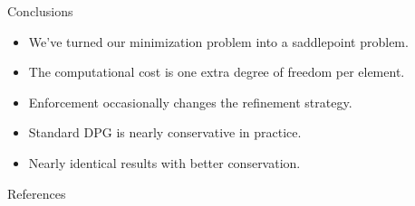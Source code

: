 \documentclass[final]{beamer}
\newlength{\onecolwid}
\begin{document}
\begin{frame}[t]
\begin{columns}[t]
\begin{column}{\onecolwid}
\begin{block}{Conclusions}
\begin{itemize}
  \item We've turned our minimization problem into a saddlepoint problem.
  \item The computational cost is one extra degree of freedom per element.
  \item Enforcement occasionally changes the refinement strategy.
  \item Standard DPG is nearly conservative in practice.
  \item Nearly identical results with better conservation.
\end{itemize}

\end{block}
%
%
%
%
%

\begin{block}{References}

\nocite{*} %
\small{
\vspace{0.75in}}

\end{block}



\end{column}
\end{columns}
\end{frame}
\end{document}
